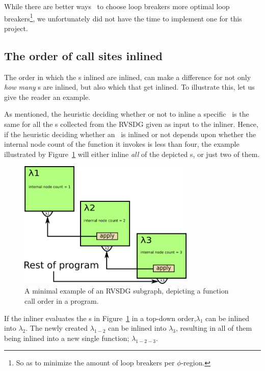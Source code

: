 While there are better ways~\cite{BasMscThesis} to choose loop breakers more
optimal loop breakers\footnote{So as to minimize the amount of loop breakers per
$\phi$-region.}, we unfortunately did not have the time to implement one for
this project.

\subsection{The order of call sites inlined}
\label{sub:scheme:ordering_apply_nodes}

The order in which the \applyNode s inlined are inlined, can make a difference
for not only \textit{how many} \applyNode s are inlined, but also which that get
inlined. To illustrate this, let us give the reader an example.

As mentioned, the heuristic deciding whether or not to inline a specific
\applyNode~is the same for all the \applyNode s collected from the RVSDG given
as input to the inliner. Hence, if the heuristic deciding whether an
\applyNode~is inlined or not depends upon whether the internal node count of the
function it invokes is less than four, the example illustrated by
Figure~\ref{fig:inline_ordering_ex} will either inline \textit{all} of the
depicted \applyNode s, or just two of them.

\begin{figure}[H]
	\centering
	\includegraphics[width=0.75\textwidth]{figures/inline_ordering_ex}
	\caption{A minimal example of an RVSDG subgraph, depicting a function call
order in a program.}
	\label{fig:inline_ordering_ex}
\end{figure}

If the inliner evaluates the \applyNode s in Figure~\ref{fig:inline_ordering_ex}
in a top-down order,$\lambda_1$ can be inlined into $\lambda_2$. The newly
created $\lambda_{1-2}$ can be inlined into $\lambda_3$, resulting in all of
them being inlined into a new single function; $\lambda_{1-2-3}$.

